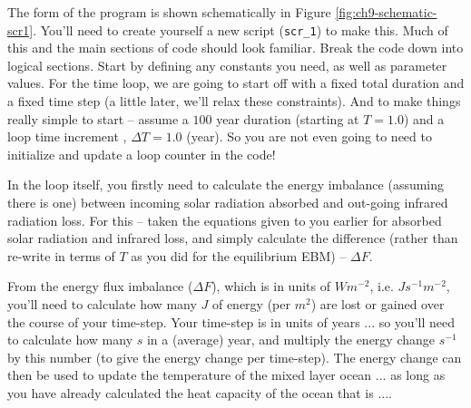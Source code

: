 \documentclass{tufte-book} %
\begin{document}
The form of the program is shown schematically in Figure \ref{fig:ch9-schematic-scr1}. You'll need to create yourself a new script (\texttt{scr\_1}) to make this. Much of this and the main sections of code should look familiar. Break the code down into logical sections. Start by defining any constants you need, as well as parameter values. For the time loop, we are going to start off with a fixed total duration and a fixed time step (a little later, we'll relax these constraints). And to make things really simple to start -- assume a \(100\) year duration (starting at \(T=1.0\)) and a loop time increment , \(\Delta T=1.0\) (year). So you are not even going to need to initialize and update a loop counter in the code! 

In the loop itself, you firstly need to calculate the energy imbalance (assuming there is one) between incoming solar radiation absorbed  and out-going infrared radiation loss. For this -- taken the equations given to you earlier for absorbed solar radiation and infrared loss, and simply calculate the difference (rather than re-write in terms of \(T\) as you did for the equilibrium EBM) -- \(\Delta F\).

From the energy flux imbalance (\(\Delta F\)), which is in units of \(Wm^{-2}\), i.e. \(Js^{-1}m^{-2}\), you'll need to calculate how many \(J\) of energy (per \(m^{2}\)) are lost or gained over the course of your time-step. Your time-step is in units of years ... so you'll need to calculate how many \(s\) in a (average) year, and multiply the energy change \(s^{-1}\) by this number (to give the energy change per time-step). The energy change can then be used to update the temperature of the mixed layer ocean ... as long as you have already calculated the heat capacity of the ocean that is ....
\end{document}
